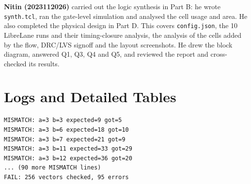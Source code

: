 \documentclass[10pt,a4paper,twocolumn]{article}
\begin{document}
\textbf{Nitin (2023112026)} carried out the logic synthesis in Part B: he wrote \texttt{synth.tcl}, ran the gate-level simulation and analysed the cell usage and area. He also completed the physical design in Part D. This covers \texttt{config.json}, the 10 LibreLane runs and their timing-closure analysis, the analysis of the cells added by the flow, DRC/LVS signoff and the layout screenshots. He drew the block diagram, answered Q1, Q3, Q4 and Q5, and reviewed the report and cross-checked its results.

\appendix
\section{Logs and Detailed Tables}
\label{app:logs}

\begin{lstlisting}[caption={Error test (\texttt{sum = a \^{} b}): first mismatches and summary.},captionpos=b,label={lst:fail}]
MISMATCH: a=3 b=3 expected=9 got=5
MISMATCH: a=3 b=6 expected=18 got=10
MISMATCH: a=3 b=7 expected=21 got=9
MISMATCH: a=3 b=11 expected=33 got=29
MISMATCH: a=3 b=12 expected=36 got=20
... (90 more MISMATCH lines)
FAIL: 256 vectors checked, 95 errors
\end{lstlisting}


\end{document}
